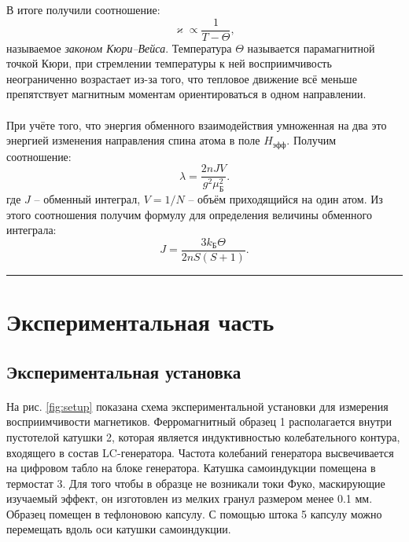 \documentclass[a4paper,12pt]{article} %
\begin{document}
	В итоге получили соотношение:
	\begin{equation}
	\varkappa \propto \dfrac{1}{T - \Theta},
	\end{equation}
	называемое \textit{законом Кюри--Вейса}. Температура $\Theta$ называется парамагнитной точкой Кюри, при стремлении температуры к ней восприимчивость неограниченно возрастает из-за того, что тепловое движение всё меньше препятствует магнитным моментам ориентироваться в одном направлении.
	
\paragraph{}
	При учёте того, что энергия обменного взаимодействия умноженная на два это энергией изменения направления спина атома в поле $H_{\text{эфф}}$. Получим соотношение:
\[
\lambda = \dfrac{2nJV}{g^2\mu^2_\text{Б}}.
\]
 где $J$ -- обменный интеграл, $V = 1/N$ -- объём приходящийся на один атом. Из этого соотношения получим формулу для определения величины обменного интеграла:
\begin{equation}
J = \frac{3 k_\text{Б} \Theta}{2nS(S + 1)}.
\label{e:integral}
\end{equation}

\medskip\hrule\medskip

\section{Экспериментальная часть}

\subsection{Экспериментальная установка}

\paragraph{}
	На рис. \ref{fig:setup} показана схема экспериментальной установки для измерения восприимчивости магнетиков. Ферромагнитный образец 1 располагается внутри пустотелой катушки 2, которая является индуктивностью колебательного контура, входящего в состав LC-генератора. Частота колебаний генератора высвечивается на цифровом табло на блоке генератора. Катушка самоиндукции помещена в термостат 3. Для того чтобы в образце не возникали токи Фуко, маскирующие изучаемый эффект, он изготовлен из мелких гранул размером менее 0.1 мм. Образец помещен в тефлоновою капсулу. С помощью штока 5 капсулу можно перемещать вдоль оси катушки самоиндукции.
\end{document}

